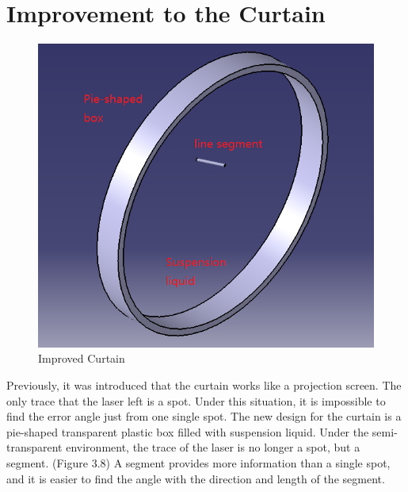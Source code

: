 \section{Improvement to the Curtain}
\begin{figure}[ht!]
\begin{center}
\includegraphics[scale = 0.8]{pics/improvedcurtain.png}
\caption{Improved Curtain}
\end{center}
\end{figure}
Previously, it was introduced that the curtain works like a projection screen. The only trace that the laser left is a spot. Under this situation, it is impossible to find the error angle just from one single spot. The new design for the curtain is a pie-shaped transparent plastic box filled with suspension liquid. Under the semi-transparent environment, the trace of the laser is no longer a spot, but a segment. (Figure 3.8) A segment provides more information than a single spot, and it is easier to find the angle with the direction and length of the segment.

